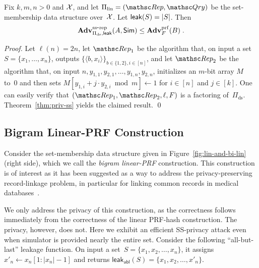 \begin{theorem}%
\label{thm:lin-privacy} Fix $k,m,n>0$ and ${\cal X}$, and let
$\setprim_{\mathrm{lin}}= (\Rep, \Qry)$ be the set-membership data
structure over~${\cal X}$. Let ${\sf leak}(S)=|S|$.  Then 
\[
\mathrm{\mathbf{Adv}}^{\mathrm{ss\mbox{-}rep}}_{\Pi_{\mathrm{ds}},{\sf leak}}(A,{\sf Sim}) \leq  \mathbf{Adv}^{\mathrm{prf}}_{F}(B)\;.
\]
\end{theorem}
\begin{proof}
Let $\ell(n) = 2n$, let $\Rep_1$ be the algorithm that, on input a
set $S=\{x_1,\ldots,x_n\}$, outputs $\{\langle b,x_i \rangle\}_{b\in
\{1,2\}, i \in [n]}$, and let $\Rep_2$ be the algorithm that, on
input $n,y_{1,1}, y_{2,1}, \ldots, y_{1,n}, y_{2,n}$,  initializes
an $m$-bit array $M$ to~0 and then sets $M[y_{1,i}+j \cdot y_{2,i}
\bmod m] \gets 1$ for $i \in [n]$ and $j \in [k]$. One can easily
verify that $(\Rep_1, \Rep_2, \ell, F)$ is a factoring
of~$\Pi_{\mathrm{ds}}$. Theorem~\ref{thm:priv-ss} yields the claimed
result. \hfill\qed
\end{proof}

\subsection{Bigram Linear-PRF Construction}
Consider the set-membership data structure given in
Figure~\ref{fig:lin-and-bi-lin} (right side), which we call the
\emph{bigram linear-PRF} construction.  This construction is of interest as it has been
suggested as a way to address the privacy-preserving record-linkage
problem, in particular for linking common records in medical
databases~\cite{niedermeyer2014cryptanalysis}. %

 We only address the privacy of this
construction, as the correctness follows immediately from the
correctness of the linear PRF-hash construction.  The privacy, however, does not.
Here we
exhibit an efficient SS-privacy attack even when simulator is
provided nearly the entire set. Consider the following
``all-but-last'' leakage function. On input a
set~$S=\{x_1,x_2,\ldots,x_n\}$, it assigns $x'_n \gets
x_n[1:|x_n|-1]$ and returns
$\mathsf{leak_{abl}}(S)=\{x_1,x_2,\ldots,x'_n\}$.

